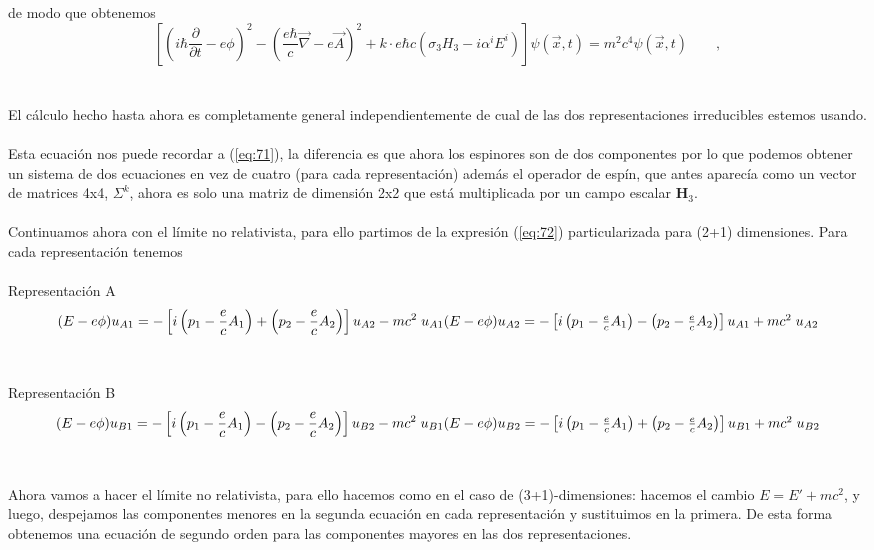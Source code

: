 \documentclass[11pt,letterpaper]{article}     %
\begin{document}
de modo que obtenemos
\begin{equation}\label{eq:132}
\left[ \left(i \hbar \frac{\partial}{\partial t} - e \phi\right)^2 - \left( \frac{e \hbar}{c} \vec{\nabla} - e \vec{A}\right)^2 +  \textit{k} \cdot e \hbar c(\sigma_3 \textit{H}_3 - i \alpha^i \textit{E}^i)\right]\psi(\vec{x},t)=m^2c^4 \psi(\vec{x},t) \qquad ,
\end{equation} \\ \\
El cálculo hecho hasta ahora es completamente general independientemente de cual de las dos representaciones irreducibles estemos usando. \\ \\
Esta ecuación nos puede recordar a (\ref{eq:71}), la diferencia es que ahora los espinores son de dos componentes por lo que podemos obtener un sistema de dos ecuaciones en vez de cuatro (para cada representación) además el operador de espín, que antes aparecía como un vector de matrices 4x4, $\Sigma^k$, ahora es solo una matriz de dimensión 2x2 que está multiplicada por un campo escalar $\textbf{H}_3$. \\ \\
Continuamos ahora con el límite no relativista, para ello partimos de la expresión (\ref{eq:72}) particularizada para (2+1) dimensiones. Para cada representación tenemos \\ \\
Representación A
\begin{equation}\label{eq:133}
(E-e\phi)u_{A1}=-\left[i\left(p_1-\frac{e}{c}A_1\right)+\left(p_2-\frac{e}{c}A_2\right)\right]u_{A2} - mc^2 \; u_{A1} $$\\$$ 
(E-e\phi)u_{A2}=-\left[i\left(p_1-\frac{e}{c}A_1 \right)-\left(p_2-\frac{e}{c}A_2\right)\right]u_{A1} + mc^2 \; u_{A2} 
\end{equation} \\ \\
Representación B
\begin{equation}\label{eq:134}
(E-e\phi)u_{B1}=-\left[i\left(p_1-\frac{e}{c}A_1\right)-\left(p_2-\frac{e}{c}A_2\right)\right]u_{B2} - mc^2 \; u_{B1} $$\\$$ 
(E-e\phi)u_{B2}=-\left[i\left(p_1-\frac{e}{c}A_1 \right)+\left(p_2-\frac{e}{c}A_2\right)\right]u_{B1} + mc^2 \; u_{B2} 
\end{equation} \\ \\
Ahora vamos a hacer el límite no relativista, para ello hacemos como en el caso de (3+1)-dimensiones: hacemos el cambio $E=E'+mc^2$, y luego, despejamos las componentes menores en la segunda ecuación en cada representación y sustituimos en la primera. De esta forma obtenemos una ecuación de segundo orden para las componentes mayores en las dos representaciones.
\end{document}
